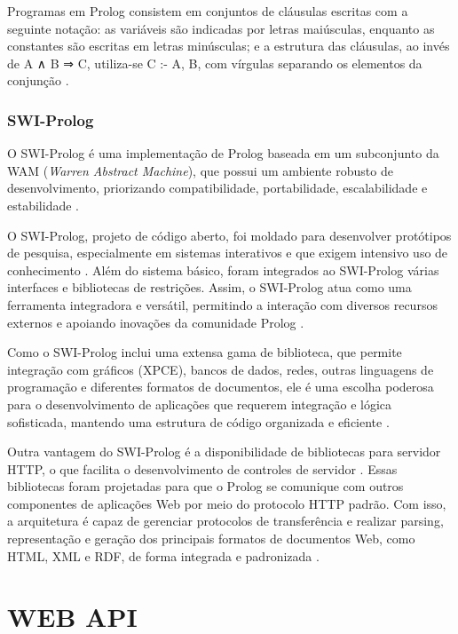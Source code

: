 Programas em Prolog consistem em conjuntos de cláusulas escritas com a seguinte notação:  as variáveis são indicadas por letras maiúsculas, enquanto as constantes são escritas em letras minúsculas; e  a estrutura das cláusulas, ao invés de A ∧ B ⇒ C, utiliza-se C :- A, B, com vírgulas separando os elementos da conjunção \cite{stuartrussel}.

\subsubsection{SWI-Prolog}

O SWI-Prolog é uma implementação de Prolog baseada em um subconjunto da WAM (\textit{Warren Abstract Machine}), que possui um ambiente robusto de desenvolvimento, priorizando compatibilidade, portabilidade, escalabilidade e estabilidade \cite{wielemakerswiprolog}. 

O SWI-Prolog, projeto de código aberto, foi moldado para desenvolver protótipos de pesquisa, especialmente em sistemas interativos e que exigem intensivo uso de conhecimento \cite{wielemakerswiprolog2}. Além do sistema básico, foram integrados ao SWI-Prolog várias interfaces e bibliotecas de restrições. Assim, o SWI-Prolog atua como uma ferramenta integradora e versátil, permitindo a interação com diversos recursos externos e apoiando inovações da comunidade Prolog \cite{wielemakerswiprolog2}.

Como o SWI-Prolog inclui uma extensa gama de biblioteca, que permite integração com gráficos (XPCE), bancos de dados, redes, outras linguagens de programação e diferentes formatos de documentos, ele é uma escolha poderosa para o desenvolvimento de aplicações que requerem integração e lógica sofisticada, mantendo uma estrutura de código organizada e eficiente \cite[p.~1]{wielemakerswiprologversion7}.

Outra vantagem do SWI-Prolog é a disponibilidade de bibliotecas para servidor HTTP, o que facilita o desenvolvimento de controles de servidor \cite{wielemakerswish}. Essas bibliotecas foram projetadas para que o Prolog se comunique com outros componentes de aplicações Web por meio do protocolo HTTP padrão. Com isso, a arquitetura é capaz de gerenciar protocolos de transferência e realizar parsing, representação e geração dos principais formatos de documentos Web, como HTML, XML e RDF, de forma integrada e padronizada \cite{wielemaker}.

\section{WEB API}

